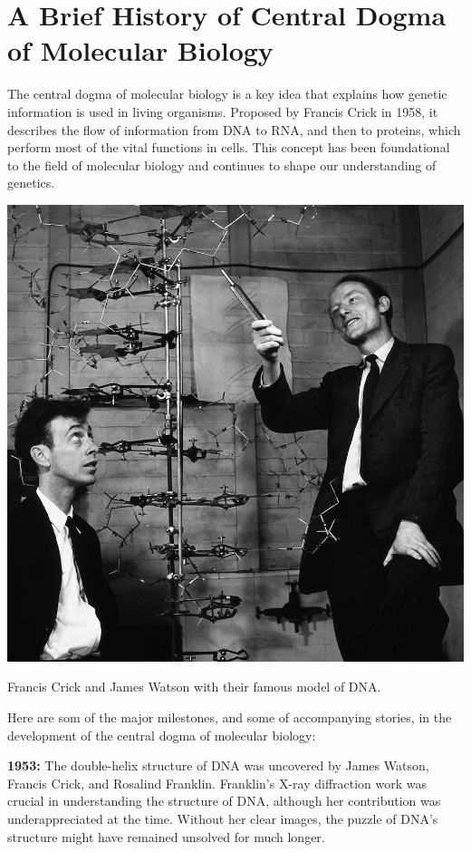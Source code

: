\chapter{A Brief History of \newline Central Dogma of Molecular Biology}

The central dogma of molecular biology is a key idea that explains how genetic information is used in living organisms. Proposed by Francis Crick in 1958, it describes the flow of information from DNA to RNA, and then to proteins, which perform most of the vital functions in cells. This concept has been foundational to the field of molecular biology and continues to shape our understanding of genetics.

\begin{marginfigure}
    \includegraphics{figs/history/watson-crick-dna.jpeg}
    \caption[6pt]{Francis Crick and James Watson with their famous model of DNA.}
    \label{fig:watson-crick-dna}
\end{marginfigure}

Here are som of the major milestones, and some of accompanying stories, in the development of the central dogma of molecular biology:

\medskip\noindent\textbf{1953:} The double-helix structure of DNA was uncovered by James Watson, Francis Crick, and Rosalind Franklin. Franklin’s X-ray diffraction work was crucial in understanding the structure of DNA, although her contribution was underappreciated at the time. Without her clear images, the puzzle of DNA’s structure might have remained unsolved for much longer.

